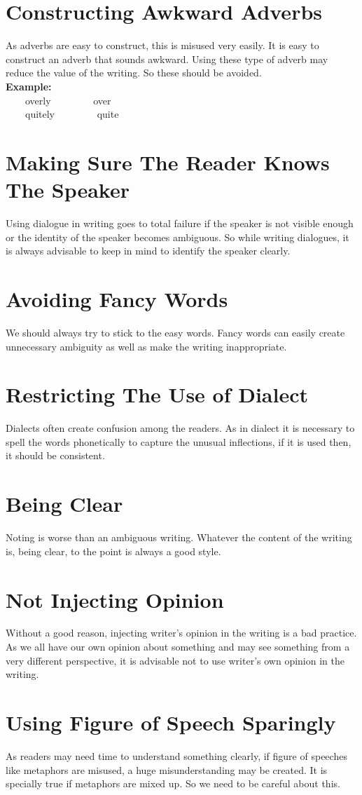 \documentclass[12pt]{report}
\newcommand{\xmpl}{\textbf{Example:}\\} %
\newcommand{\indnt}{\ \ \ \ } %
\begin{document}
\section{Constructing Awkward Adverbs}
As adverbs are easy to construct, this is misused very easily. It is easy to construct an adverb that sounds awkward. Using these type of adverb may reduce the value of the writing. So these should be avoided.\\
\xmpl
\indnt overly \indnt \indnt over\\
\indnt quitely \indnt \indnt quite\\
\section{Making Sure The Reader Knows The Speaker}
Using dialogue in writing goes to total failure if the speaker is not visible enough or the identity of the speaker becomes ambiguous.
So while writing dialogues, it is always advisable to keep in mind to identify the speaker clearly.
\section{Avoiding Fancy Words}
We should always try to stick to the easy words. Fancy words can easily create unnecessary ambiguity as well as make the writing inappropriate.
\section{Restricting The Use of Dialect}
Dialects often create confusion among the readers. As in dialect it is necessary to spell the words phonetically to capture the unusual inflections, if it is used then, it should be consistent.
\section{Being Clear}
Noting is worse than an ambiguous writing. Whatever the content of the writing is, being clear, to the point is always a good style.
\section{Not Injecting Opinion}
Without a good reason, injecting writer's opinion in the writing is a bad practice. As we all have our own opinion about something and may see something from a very different perspective, it is advisable not to use writer's own opinion in the writing.
\section{Using Figure of Speech Sparingly}
As readers may need time to understand something clearly, if figure of speeches like metaphors are misused, a huge misunderstanding may be created. It is specially true if metaphors are mixed up. So we need to be careful about this.
\end{document}
